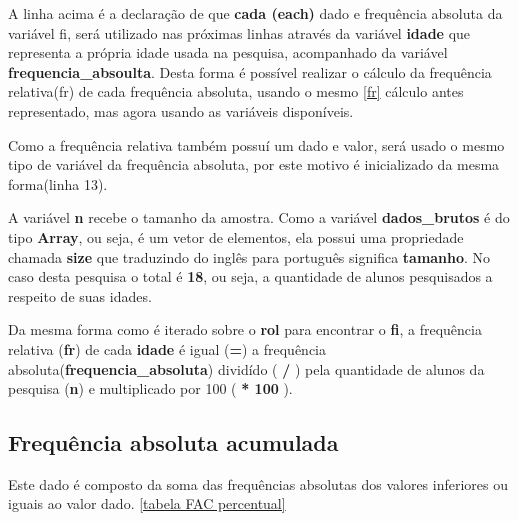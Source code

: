 \documentclass[12pt]{article}
\newcommand{\code}[1] {\textbf{#1}}
\begin{document}
A linha acima é a declaração de que \code{cada (each)} dado e frequência absoluta da variável fi, será utilizado nas próximas linhas através da variável \code{idade} que representa a própria idade usada na pesquisa, acompanhado da variável \code{frequencia\_absoulta}. Desta forma é possível realizar o cálculo da frequência relativa(fr) de cada frequência absoluta, usando o mesmo \ref{fr} cálculo antes representado, mas agora usando as variáveis disponíveis.

 

Como a frequência relativa também possuí um dado e valor, será usado o mesmo tipo de variável da frequência absoluta, por este motivo é inicializado da mesma forma(linha 13).

A variável \code{n} recebe o tamanho da amostra. Como a variável \code{dados\_brutos} é do tipo \code{Array}, ou seja, é um vetor de elementos, ela possui uma propriedade chamada \code{size} que traduzindo do inglês para português significa \code{tamanho}. No caso desta pesquisa o total é \code{18}, ou seja, a quantidade de alunos pesquisados a respeito de suas idades.

Da mesma forma como é iterado sobre o \code{rol} para encontrar o \code{fi}, a frequência relativa (\code{fr}) de cada \code{idade} é igual (\code{=}) a frequência absoluta(\code{frequencia\_absoluta}) dividído ( \code{/} ) pela quantidade de alunos da pesquisa (\code{n}) e multiplicado por 100 (\code{ * 100 }).

\subsection{ Frequência absoluta acumulada} 

Este dado é composto da soma das frequências absolutas dos valores inferiores ou iguais ao valor dado. \ref{tabela FAC percentual}
\end{document}
